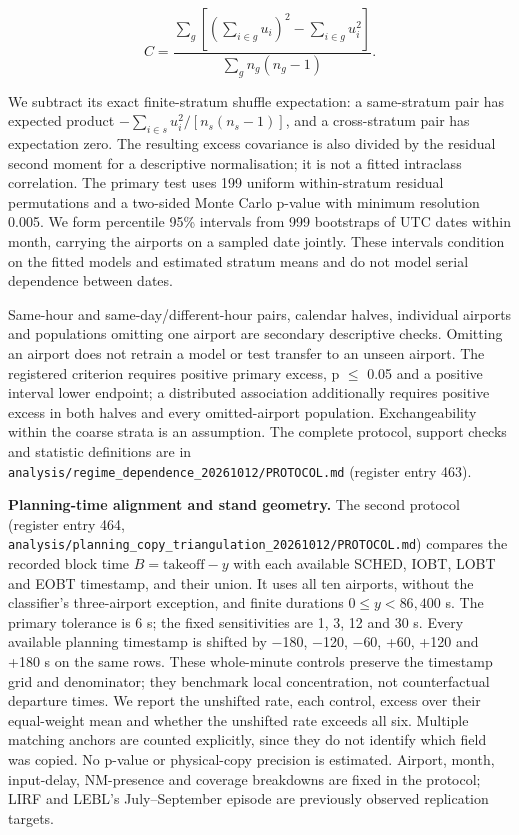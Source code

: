 \documentclass[
  manuscript=article,  %
  layout=preprint,     %
  year=2026,
  volume=4,
]{extra/joas}
\begin{document}
\begin{equation}C = \frac{\sum_g[(\sum_{i\in g}u_i)^2-\sum_{i\in g}u_i^2]}
{\sum_g n_g(n_g-1)}.\end{equation}

We subtract its exact finite-stratum shuffle expectation: a same-stratum pair has expected product \(-\sum_{i\in s}u_i^2/[n_s(n_s-1)]\), and a cross-stratum pair has expectation zero. The resulting excess covariance is also divided by the residual second moment for a descriptive normalisation; it is not a fitted intraclass correlation. The primary test uses 199 uniform within-stratum residual permutations and a two-sided Monte Carlo p-value with minimum resolution 0.005. We form percentile 95\% intervals from 999 bootstraps of UTC dates within month, carrying the airports on a sampled date jointly. These intervals condition on the fitted models and estimated stratum means and do not model serial dependence between dates.

Same-hour and same-day/different-hour pairs, calendar halves, individual airports and populations omitting one airport are secondary descriptive checks. Omitting an airport does not retrain a model or test transfer to an unseen airport. The registered criterion requires positive primary excess, p \(\leq\) 0.05 and a positive interval lower endpoint; a distributed association additionally requires positive excess in both halves and every omitted-airport population. Exchangeability within the coarse strata is an assumption. The complete protocol, support checks and statistic definitions are in \texttt{analysis/\allowbreak{}regime\_\allowbreak{}dependence\_\allowbreak{}20261012/\allowbreak{}PROTOCOL.md} (register entry 463).

\textbf{Planning-time alignment and stand geometry.} The second protocol (register entry 464, \texttt{analysis/\allowbreak{}planning\_\allowbreak{}copy\_\allowbreak{}triangulation\_\allowbreak{}20261012/\allowbreak{}PROTOCOL.md}) compares the recorded block time \(B=\mathrm{takeoff}-y\) with each available SCHED, IOBT, LOBT and EOBT timestamp, and their union. It uses all ten airports, without the classifier's three-airport exception, and finite durations \(0\leq y<86{,}400\) s. The primary tolerance is 6 s; the fixed sensitivities are 1, 3, 12 and 30 s. Every available planning timestamp is shifted by $-$180, $-$120, $-$60, +60, +120 and +180 s on the same rows. These whole-minute controls preserve the timestamp grid and denominator; they benchmark local concentration, not counterfactual departure times. We report the unshifted rate, each control, excess over their equal-weight mean and whether the unshifted rate exceeds all six. Multiple matching anchors are counted explicitly, since they do not identify which field was copied. No p-value or physical-copy precision is estimated. Airport, month, input-delay, NM-presence and coverage breakdowns are fixed in the protocol; LIRF and LEBL's July--September episode are previously observed replication targets.
\end{document}
